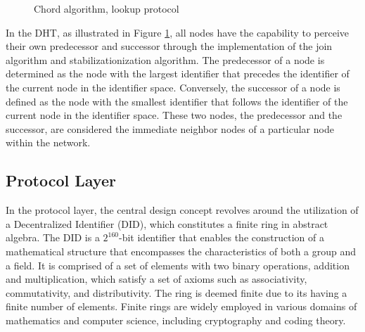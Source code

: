 \documentclass[twocolumn]{article}
\begin{document}
\begin{figure}[h]
    \begin{center}

    \end{center}
    \label{dht}
      \caption{Chord algorithm, lookup protocol}

    \end{figure}
In the DHT, as illustrated in Figure \ref{dht}, all nodes have the capability to perceive their own predecessor and successor through the implementation of the join algorithm and stabilizationization algorithm. The predecessor of a node is determined as the node with the largest identifier that precedes the identifier of the current node in the identifier space. Conversely, the successor of a node is defined as the node with the smallest identifier that follows the identifier of the current node in the identifier space. These two nodes, the predecessor and the successor, are considered the immediate neighbor nodes of a particular node within the network.

\subsection{Protocol Layer}

In the protocol layer, the central design concept revolves around the utilization of a Decentralized Identifier (DID), which constitutes a finite ring in abstract algebra. The DID is a $2^{160}$-bit identifier that enables the construction of a mathematical structure that encompasses the characteristics of both a group and a field. It is comprised of a set of elements with two binary operations, addition and multiplication, which satisfy a set of axioms such as associativity, commutativity, and distributivity. The ring is deemed finite due to its having a finite number of elements. Finite rings are widely employed in various domains of mathematics and computer science, including cryptography and coding theory.
\end{document}
